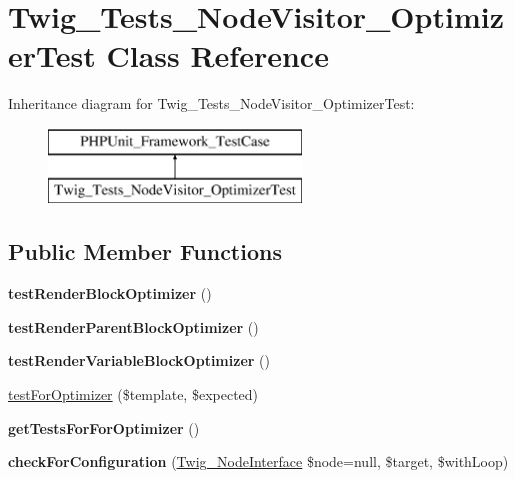 \hypertarget{classTwig__Tests__NodeVisitor__OptimizerTest}{}\section{Twig\+\_\+\+Tests\+\_\+\+Node\+Visitor\+\_\+\+Optimizer\+Test Class Reference}
\label{classTwig__Tests__NodeVisitor__OptimizerTest}
Inheritance diagram for Twig\+\_\+\+Tests\+\_\+\+Node\+Visitor\+\_\+\+Optimizer\+Test\+:\begin{figure}[H]
\begin{center}
\leavevmode
\includegraphics[height=2.000000cm]{classTwig__Tests__NodeVisitor__OptimizerTest}
\end{center}
\end{figure}
\subsection*{Public Member Functions}
\begin{DoxyCompactItemize}
\item 
{\bfseries test\+Render\+Block\+Optimizer} ()\hypertarget{classTwig__Tests__NodeVisitor__OptimizerTest_ac8d287b52708437101585dc7fd268b73}{}\label{classTwig__Tests__NodeVisitor__OptimizerTest_ac8d287b52708437101585dc7fd268b73}

\item 
{\bfseries test\+Render\+Parent\+Block\+Optimizer} ()\hypertarget{classTwig__Tests__NodeVisitor__OptimizerTest_a3c5dc919da0530bd8db6a8861a458d10}{}\label{classTwig__Tests__NodeVisitor__OptimizerTest_a3c5dc919da0530bd8db6a8861a458d10}

\item 
{\bfseries test\+Render\+Variable\+Block\+Optimizer} ()\hypertarget{classTwig__Tests__NodeVisitor__OptimizerTest_a58fbb5b021e68c0feb3b0e0864103110}{}\label{classTwig__Tests__NodeVisitor__OptimizerTest_a58fbb5b021e68c0feb3b0e0864103110}

\item 
\hyperlink{classTwig__Tests__NodeVisitor__OptimizerTest_a4c67eb9ecaf65f26d29f7d0d1607b307}{test\+For\+Optimizer} (\$template, \$expected)
\item 
{\bfseries get\+Tests\+For\+For\+Optimizer} ()\hypertarget{classTwig__Tests__NodeVisitor__OptimizerTest_a310e8fa4ba87be3d5e27de47d3f313ad}{}\label{classTwig__Tests__NodeVisitor__OptimizerTest_a310e8fa4ba87be3d5e27de47d3f313ad}

\item 
{\bfseries check\+For\+Configuration} (\hyperlink{interfaceTwig__NodeInterface}{Twig\+\_\+\+Node\+Interface} \$node=null, \$target, \$with\+Loop)\hypertarget{classTwig__Tests__NodeVisitor__OptimizerTest_a9a34e40589fb17a601a46c528987dacd}{}\label{classTwig__Tests__NodeVisitor__OptimizerTest_a9a34e40589fb17a601a46c528987dacd}

\end{DoxyCompactItemize}


